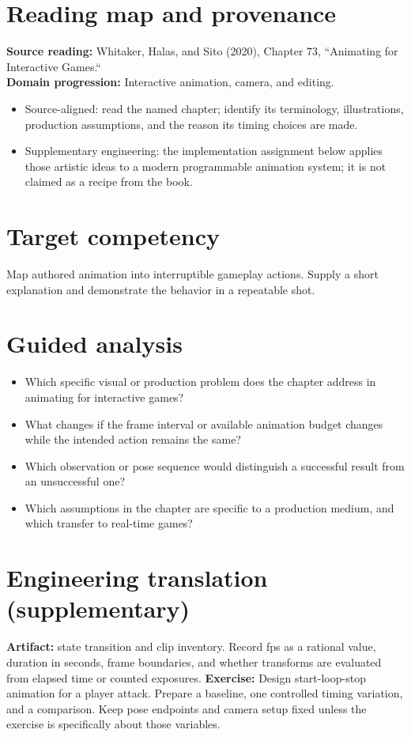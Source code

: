 \documentclass[10pt,letterpaper]{article}
\begin{document}
\makedoctitle
\makedocsummary

\section{Reading map and provenance}
\textbf{Source reading:} Whitaker, Halas, and Sito (2020), Chapter 73, ``Animating for Interactive Games.``\\
\textbf{Domain progression:} Interactive animation, camera, and editing.
\begin{itemize}
\item Source-aligned: read the named chapter; identify its terminology, illustrations, production assumptions, and the reason its timing choices are made.
\item Supplementary engineering: the implementation assignment below applies those artistic ideas to a modern programmable animation system; it is not claimed as a recipe from the book.
\end{itemize}
\section{Target competency}
Map authored animation into interruptible gameplay actions. Supply a short explanation and demonstrate the behavior in a repeatable shot.
\section{Guided analysis}
\begin{itemize}
\item Which specific visual or production problem does the chapter address in animating for interactive games?
\item What changes if the frame interval or available animation budget changes while the intended action remains the same?
\item Which observation or pose sequence would distinguish a successful result from an unsuccessful one?
\item Which assumptions in the chapter are specific to a production medium, and which transfer to real-time games?
\end{itemize}
\section{Engineering translation (supplementary)}
\textbf{Artifact:} state transition and clip inventory. Record fps as a rational value, duration in seconds, frame boundaries, and whether transforms are evaluated from elapsed time or counted exposures.
\textbf{Exercise:} Design start-loop-stop animation for a player attack. Prepare a baseline, one controlled timing variation, and a comparison. Keep pose endpoints and camera setup fixed unless the exercise is specifically about those variables.
\end{document}
